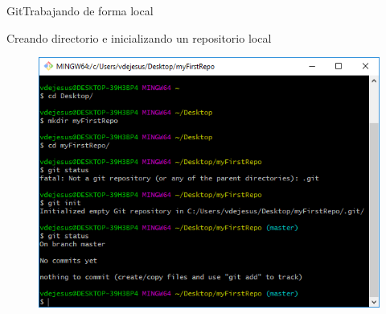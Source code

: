 \documentclass[10pt]{beamer}
\begin{document}
\begin{frame}{Git}{Trabajando de forma local}

\begin{block}{Creando directorio e inicializando un repositorio local}


\begin{figure}[h!]
\centering
\includegraphics [scale=0.5]{step1}
\label{fig:gitclone2}
\end{figure}

\end{block}

\end{frame}
\end{document}
